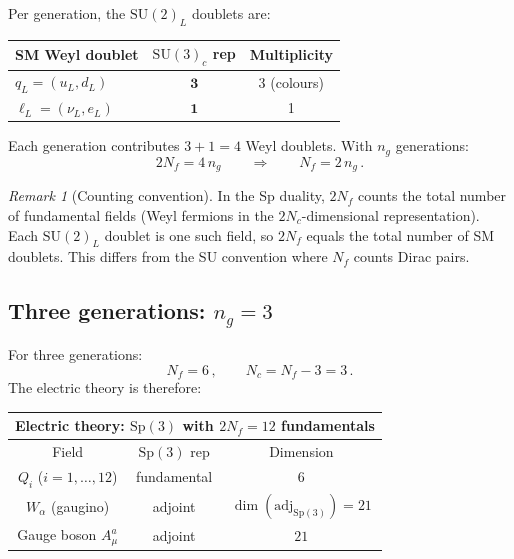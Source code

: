 \documentclass[11pt,a4paper]{article}
\theoremstyle{plain}
\theoremstyle{definition}
\theoremstyle{remark}
\newtheorem{remark}[theorem]{Remark}
\newcommand{\Nc}{N_{\!c}}
\newcommand{\Nf}{N_{\!f}}
\newcommand{\SU}[1]{\mathrm{SU}(#1)}
\newcommand{\Sp}[1]{\mathrm{Sp}(#1)}
\newcommand{\adj}{\mathrm{adj}}
\begin{document}
Per generation, the $\SU{2}_L$ doublets are:
\begin{center}
\renewcommand{\arraystretch}{1.3}
\begin{tabular}{l c c}
\toprule
\textbf{SM Weyl doublet} & $\SU{3}_c$ rep & Multiplicity \\
\midrule
$q_L = (u_L, d_L)$ & $\mathbf{3}$ & 3 (colours) \\
$\ell_L = (\nu_L, e_L)$ & $\mathbf{1}$ & 1 \\
\bottomrule
\end{tabular}
\end{center}
Each generation contributes $3 + 1 = 4$ Weyl doublets.  With $n_g$
generations:
\begin{equation}\label{eq:2Nf}
  2\Nf = 4\, n_g
  \qquad\Longrightarrow\qquad
  \Nf = 2\, n_g\,.
\end{equation}

\begin{remark}[Counting convention]
In the Sp duality, $2\Nf$ counts the total number of fundamental
fields (Weyl fermions in the $2\Nc$-dimensional representation).
Each $\SU{2}_L$ doublet is one such field, so $2\Nf$ equals the
total number of SM doublets.  This differs from the SU convention
where $\Nf$ counts Dirac pairs.
\end{remark}

\subsection{Three generations: $n_g = 3$}

For three generations:
\begin{equation}\label{eq:Nf6}
  \Nf = 6\,,
  \qquad
  \Nc = \Nf - 3 = 3\,.
\end{equation}
The electric theory is therefore:

\begin{center}
\renewcommand{\arraystretch}{1.4}
\begin{tabular}{c c c}
\toprule
\multicolumn{3}{c}{\textbf{Electric theory: $\Sp{3}$ with
$2\Nf = 12$ fundamentals}} \\
\midrule
Field & $\Sp{3}$ rep & Dimension \\
\midrule
$Q_i$ ($i = 1,\ldots,12$) & fundamental & $6$ \\
$W_\alpha$ (gaugino) & adjoint & $\dim(\adj_{\Sp{3}}) = 21$ \\
Gauge boson $A_\mu^a$ & adjoint & $21$ \\
\bottomrule
\end{tabular}
\end{center}
\end{document}
